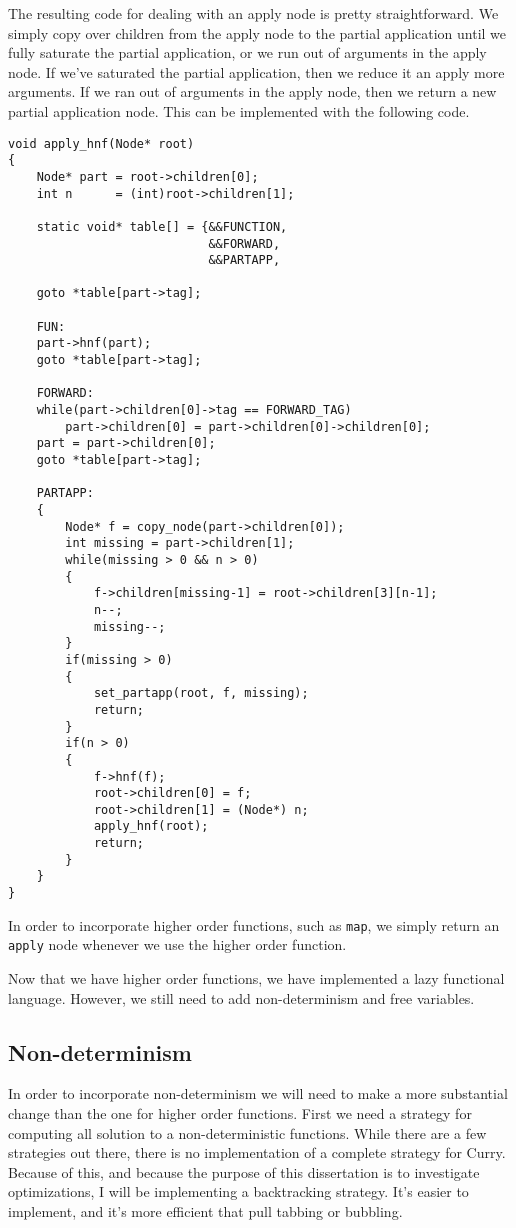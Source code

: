 \documentclass{article}
\begin{document}
The resulting code for dealing with an apply node is pretty straightforward.
We simply copy over children from the apply node to the partial application until we 
fully saturate the partial application, or we run out of arguments in the apply node.
If we've saturated the partial application, then we reduce it an apply more arguments.
If we ran out of arguments in the apply node, then we return a new partial application node.
This can be implemented with the following code.


\begin{verbatim}
void apply_hnf(Node* root)
{
    Node* part = root->children[0];
    int n      = (int)root->children[1];

    static void* table[] = {&&FUNCTION, 
                            &&FORWARD, 
                            &&PARTAPP,

    goto *table[part->tag];

    FUN:
    part->hnf(part);
    goto *table[part->tag];

    FORWARD:
    while(part->children[0]->tag == FORWARD_TAG)
        part->children[0] = part->children[0]->children[0];
    part = part->children[0];
    goto *table[part->tag];

    PARTAPP:
    {
        Node* f = copy_node(part->children[0]);
        int missing = part->children[1];
        while(missing > 0 && n > 0)
        {
            f->children[missing-1] = root->children[3][n-1];
            n--;
            missing--;
        }
        if(missing > 0)
        {
            set_partapp(root, f, missing);
            return;
        }
        if(n > 0)
        {
            f->hnf(f);
            root->children[0] = f;
            root->children[1] = (Node*) n;
            apply_hnf(root);
            return;
        }
    }
}
\end{verbatim}

In order to incorporate higher order functions, such as \texttt{map},
we simply return an \texttt{apply} node whenever we use the higher order function.

Now that we have higher order functions, we have implemented a lazy functional language.
However, we still need to add non-determinism and free variables.

\subsection{Non-determinism}

In order to incorporate non-determinism we will need to make a more substantial change
than the one for higher order functions.
First we need a strategy for computing all solution to a non-deterministic functions.
While there are a few strategies out there,
there is no implementation of a complete strategy for Curry.
Because of this, and because the purpose of this dissertation is to investigate optimizations,
I will be implementing a backtracking strategy.
It's easier to implement, and it's more efficient that pull tabbing or bubbling.
\end{document}
